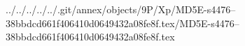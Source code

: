../../../../../.git/annex/objects/9P/Xp/MD5E-s4476--38bbdcd661f406410d0649432a08fe8f.tex/MD5E-s4476--38bbdcd661f406410d0649432a08fe8f.tex